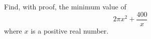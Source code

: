Find, with proof, the minimum value of
\[
2\pi x^2+\dfrac{400}{x}
\]
where $x$ is a positive real number.

